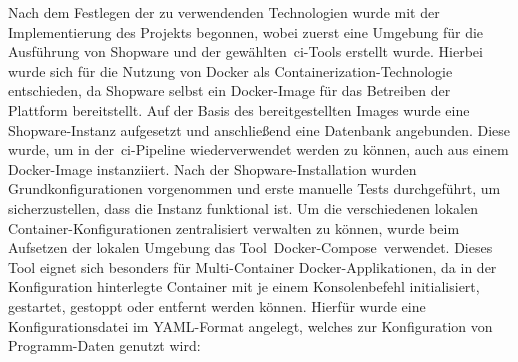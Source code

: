 Nach dem Festlegen der zu verwendenden Technologien wurde mit der Implementierung des Projekts begonnen, wobei
zuerst eine Umgebung für die Ausführung von Shopware und der gewählten\ \acrshort{ci}-Tools erstellt wurde.
Hierbei wurde sich für die Nutzung von Docker als Containerization-Technologie entschieden, da Shopware selbst ein
Docker-Image für das Betreiben der Plattform bereitstellt.
Auf der Basis des bereitgestellten Images wurde eine Shopware-Instanz aufgesetzt und anschließend eine Datenbank
angebunden.
Diese wurde, um in der\ \acrshort{ci}-Pipeline wiederverwendet werden zu können, auch aus einem Docker-Image
instanziiert.
Nach der Shopware-Installation wurden Grundkonfigurationen vorgenommen und erste manuelle Tests durchgeführt, um
sicherzustellen, dass die Instanz funktional ist.
Um die verschiedenen lokalen Container-Konfigurationen zentralisiert verwalten zu können, wurde beim Aufsetzen der
lokalen Umgebung das Tool\ \glqq Docker-Compose\grqq\ verwendet.
Dieses Tool eignet sich besonders für Multi-Container Docker-Applikationen, da in der Konfiguration hinterlegte
Container mit je einem Konsolenbefehl initialisiert, gestartet, gestoppt oder entfernt werden können.
Hierfür wurde eine Konfigurationsdatei im YAML-Format angelegt, welches zur Konfiguration von Programm-Daten
genutzt wird:


